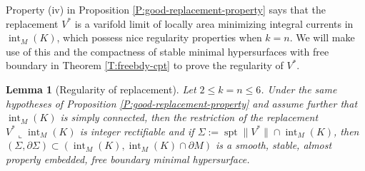 \documentclass[10pt]{amsart}
\newtheorem{lemma}[theorem]{Lemma}
\theoremstyle{definition}
\theoremstyle{remark}
\numberwithin{equation}{section}
\newcommand{\lc}{\llcorner}
\newcommand{\spt}{\operatorname{spt}}
\newcommand{\interior}{\operatorname{int}}
\begin{document}
Property (iv) in Proposition \ref{P:good-replacement-property} says that the replacement $V^*$ is a varifold limit of locally area minimizing integral currents in $\interior_M(K)$, which possess nice regularity properties when $k=n$. We will make use of this and the compactness of stable minimal hypersurfaces with free boundary in Theorem \ref{T:freebdy-cpt} to prove the regularity of $V^*$.


\begin{lemma}[Regularity of replacement]
\label{L:reg-replacement}
Let $2 \leq k=n \leq 6$. Under the same hypotheses of Proposition \ref{P:good-replacement-property} and assume further that $\interior_M(K)$ is simply connected, then the restriction of the replacement $V^* \lc \interior_M(K)$ is integer rectifiable and if $\Sigma:=\spt \|V^*\| \cap \interior_M(K)$, then $(\Sigma,\partial \Sigma) \subset (\interior_M(K),\interior_M(K) \cap \partial M)$ is a smooth, stable, almost properly embedded, free boundary minimal hypersurface.
\end{lemma}
\end{document}
